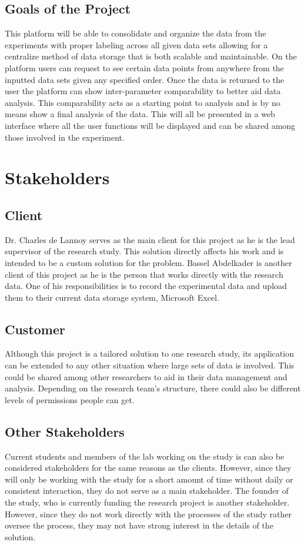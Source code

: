 \documentclass[12pt]{article}
\begin{document}
\subsection{Goals of the Project}
This platform will be able to consolidate and organize the data from the
experiments with proper labeling across all given data sets allowing for a
centralize method of data storage that is both scalable and maintainable. On the
platform users can request to see certain data points from anywhere from the
inputted data sets given any specified order. Once the data is returned to the
user the platform can show inter-parameter comparability to better aid data
analysis. This comparability acts as a starting point to analysis and is by no
means show a final analysis of the data. This will all be presented in a web
interface where all the user functions will be displayed and can be shared among
those involved in the experiment.   
\section{Stakeholders}

\subsection{Client}
Dr. Charles de Lannoy serves as the main client for this project as he is the
lead supervisor of the research study. This solution directly affects his work and
is intended to be a custom solution for the problem. Bassel Abdelkader is
another client of this project as he is the person that works directly with the
research data. One of his responsibilities is to record the experimental data
and upload them to their current data storage system, Microsoft Excel. 
\subsection{Customer}
Although this project is a tailored solution to one research study, its
application can be extended to any other situation where large sets of data is
involved. This could be shared among other researchers to aid in their data
management and analysis. Depending on the research team's structure, there could
also be different levels of permissions people can get.
\subsection{Other Stakeholders}
Current students and members of the lab working on the study is can also be
considered stakeholders for the same reasons as the clients. However, since they
will only be working with the study for a short amount of time without daily or
consistent interaction, they do not serve as a main stakeholder. The founder of
the study, who is currently funding the research project is another stakeholder.
However, since they do not work directly with the processes of the study rather
oversee the process, they may not have strong interest in the details of the
solution. 
\end{document}
